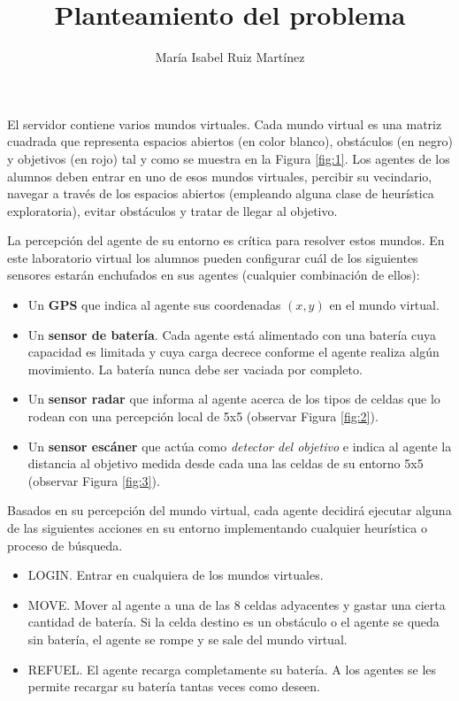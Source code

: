 \documentclass[10pt,a4paper]{article}
\author{María Isabel Ruiz Martínez}
\title{Planteamiento del problema}
\begin{document}
\maketitle

El servidor contiene varios mundos virtuales. Cada mundo virtual es una matriz cuadrada que representa espacios abiertos (en color blanco), obstáculos (en negro) y objetivos (en rojo) tal y como se muestra en la Figura \ref{fig:1}. Los agentes de los alumnos deben entrar en uno de esos mundos virtuales, percibir su vecindario, navegar a través de los espacios abiertos (empleando alguna clase de heurística exploratoria), evitar obstáculos y tratar de llegar al objetivo.

La percepción del agente de su entorno es crítica para resolver estos mundos. En este laboratorio virtual los alumnos pueden configurar cuál de los siguientes sensores estarán enchufados en sus agentes (cualquier combinación de ellos):

\begin{itemize}
	\item Un \textbf{GPS} que indica al agente sus coordenadas $(x,y)$ en el mundo virtual.
	\item Un \textbf{sensor de batería}. Cada agente está alimentado con una batería cuya capacidad es limitada y cuya carga decrece conforme el agente realiza algún movimiento. La batería nunca debe ser vaciada por completo.
	\item Un \textbf{sensor radar} que informa al agente acerca de los tipos de celdas que lo rodean con una percepción local de 5x5 (observar Figura \ref{fig:2}).
	\item Un \textbf{sensor escáner} que actúa como \emph{detector del objetivo} e indica al agente la distancia al objetivo medida desde cada una las celdas de su entorno 5x5 (observar Figura \ref{fig:3}).
\end{itemize}

Basados en su percepción del mundo virtual, cada agente decidirá ejecutar alguna de las siguientes acciones en su entorno implementando cualquier heurística o proceso de búsqueda.

\begin{itemize}
	\item LOGIN. Entrar en cualquiera de los mundos virtuales.
	\item MOVE. Mover al agente a una de las $8$ celdas adyacentes y gastar una cierta cantidad de batería. Si la celda destino es un obstáculo o el agente se queda sin batería, el agente se rompe y se sale del mundo  virtual.
	\item REFUEL. El agente recarga completamente su batería. A los agentes se les permite recargar su batería tantas veces como deseen.
\end{itemize}
\end{document}
